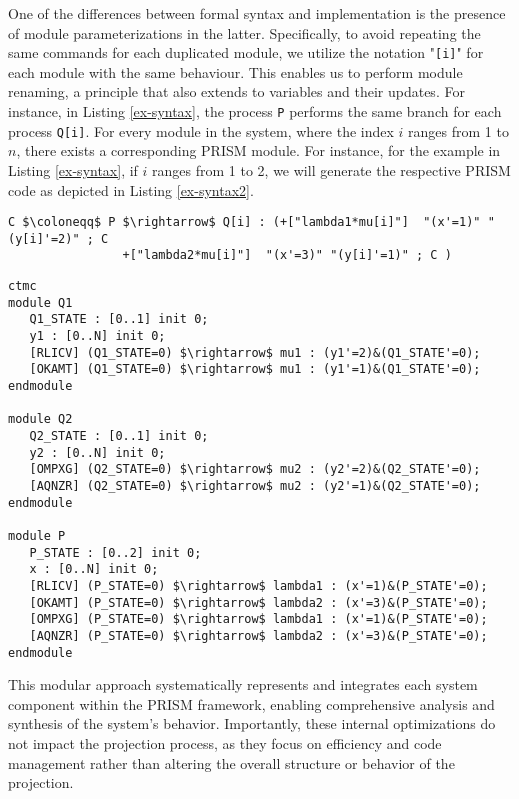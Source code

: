 One of the differences between formal syntax and implementation is the
presence of module parameterizations in the latter. Specifically, to
avoid repeating the same commands for each duplicated module, we
utilize the notation "\texttt{[i]}" for each module with the same
behaviour.  This enables us to perform module renaming, a principle
that also extends to variables and their updates. For instance, in
Listing \ref{ex-syntax}, the process \texttt{P} performs the same
branch for each process
\texttt{Q[i]}. %
For every module in the system, where the index $i$ ranges from 1 to
$n$, there exists a corresponding PRISM module. For instance, for the
example in Listing \ref{ex-syntax}, if $i$ ranges from 1 to 2, we will
generate the respective PRISM code as depicted in Listing
\ref{ex-syntax2}.
\begin{lstlisting}[style=chor-color,breaklines=true, postbreak=\mbox{\textcolor{red}{$\hookrightarrow$}\space},caption={Example of an use of parameterization in the choreographic language},captionpos=b,label={ex-syntax}]
	C $\coloneqq$ P $\rightarrow$ Q[i] : (+["lambda1*mu[i]"]  "(x'=1)" "(y[i]'=2)" ; C
			    +["lambda2*mu[i]"]  "(x'=3)" "(y[i]'=1)" ; C )
\end{lstlisting}
\begin{lstlisting}[style=prism-color,caption={PRISM code generated for the choreography in Listing \ref{ex-syntax}},captionpos=b,label={ex-syntax2}]
ctmc
module Q1
   Q1_STATE : [0..1] init 0;
   y1 : [0..N] init 0;
   [RLICV] (Q1_STATE=0) $\rightarrow$ mu1 : (y1'=2)&(Q1_STATE'=0);
   [OKAMT] (Q1_STATE=0) $\rightarrow$ mu1 : (y1'=1)&(Q1_STATE'=0);
endmodule

module Q2
   Q2_STATE : [0..1] init 0;
   y2 : [0..N] init 0;
   [OMPXG] (Q2_STATE=0) $\rightarrow$ mu2 : (y2'=2)&(Q2_STATE'=0);
   [AQNZR] (Q2_STATE=0) $\rightarrow$ mu2 : (y2'=1)&(Q2_STATE'=0);
endmodule

module P
   P_STATE : [0..2] init 0;
   x : [0..N] init 0;
   [RLICV] (P_STATE=0) $\rightarrow$ lambda1 : (x'=1)&(P_STATE'=0);
   [OKAMT] (P_STATE=0) $\rightarrow$ lambda2 : (x'=3)&(P_STATE'=0);
   [OMPXG] (P_STATE=0) $\rightarrow$ lambda1 : (x'=1)&(P_STATE'=0);
   [AQNZR] (P_STATE=0) $\rightarrow$ lambda2 : (x'=3)&(P_STATE'=0);
endmodule
\end{lstlisting}
This modular approach systematically represents and integrates each system component within the PRISM framework, enabling comprehensive analysis and synthesis of the system's behavior. Importantly, these internal optimizations do not impact the projection process, as they focus on efficiency and code management rather than altering the overall structure or behavior of the projection. %

